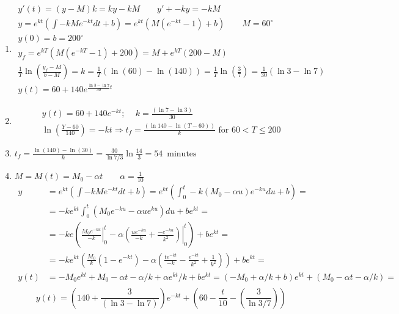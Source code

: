 \documentclass[twoside]{amsart}
\theoremstyle{plain}
\theoremstyle{definition}
\newcommand{\exercisehead}[1]
  {\smallskip
   \noindent{\small\bf Exercise #1.}}
\begin{document}
\exercisehead{7} 
\begin{enumerate}
\item 
\[
\begin{gathered}
  y'(t) = (y - M)k = ky - kM \quad \quad y' + - ky = -kM \\
  y= e^{kt} (\int -kM e^{-kt} dt + b) = e^{kt} ( M(e^{-kt} - 1 ) + b )  \quad \quad M = 60^{\circ} \\
  y(0) = b = 200^{\circ}  \\
  y_f = e^{kT} (M (e^{-kT} - 1 ) + 200 ) = M + e^{kT} (200 - M)  \\
  \frac{1}{T} \ln{ \left( \frac{ y_f - M }{ b-M } \right) } = k = \frac{1}{T} (\ln{ (60) } - \ln{ (140) } ) = \frac{1}{T} \ln{ \left( \frac{3}{7} \right) } = \frac{1}{30} (\ln{3} - \ln{7} ) \\
  \boxed{ y(t) = 60 + 140 e^{ \frac{ \ln{3} - \ln{7} }{ 30 } t } }
\end{gathered}
\]
\item 
\[
\begin{gathered}
  y(t) = 60 + 140 e^{-kt}; \quad \, k = \frac{ (\ln{7} - \ln{3})}{ 30 } \\
  \ln{ \left( \frac{Y - 60}{140} \right) } = -kt \Longrightarrow t_f = \frac{ (\ln{ 140} - \ln{ (T - 60) } ) }{ k } \text{ for } 60 < T \leq 200 
\end{gathered}
\]
\item $t_f = \frac{ \ln{ (140) } - \ln{ (30) }}{ k } = \frac{30}{ \ln{ 7/3} } \ln{ \frac{14}{3} } = 54 \, \text{ minutes } $
\item $M = M(t) = M_0 - \alpha t \quad \quad \alpha = \frac{1}{10}$
\[
\begin{aligned}
  y & = e^{kt} \left( \int -k Me^{-kt} dt + b\right)  = e^{kt} \left( \int_0^t -k (M_0 - \alpha u ) e^{-ku} du + b\right) = \\
  & = -ke^{kt} \int_0^t ( M_0 e^{-ku} - \alpha u e^{ku} ) du + be^{kt} = \\
  & = -ke \left( \left. \frac{M_0 e^{-ku} }{ -k} \right|_0^t - \alpha \left. \left( \frac{ u e^{-ku}}{ -k} + \frac{ -e^{-ku}}{k^2 } \right) \right|_0^t \right) + be^{kt} = \\
  & = -ke^{kt} \left( \frac{ M_0 }{k} ( 1 - e^{-kt} ) - \alpha \left( \frac{ te^{-kt}}{-k} - \frac{ e^{-kt}}{k^2} + \frac{1}{k^2 } \right) \right) + be^{kt} = \\
  y(t) &= -M_0 e^{kt} + M_0 - \alpha t - \alpha /k + \alpha e^{kt}/ k + be^{kt} = (-M_0 + \alpha/k +b )e^{kt} + (M_0 - \alpha t - \alpha /k ) = \\
\end{aligned}
\]
\[
\boxed{ y(t) = (140 + \frac{3}{ (\ln{3} - \ln{7} ) } ) e^{-kt} + (60 - \frac{t}{10} - \left( \frac{3}{\ln{3/7} } \right) ) }
\]
\end{enumerate}
\end{document}
